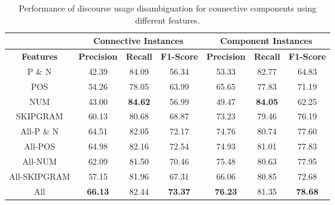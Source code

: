 \begin{table}[ht]
\centering
\begin{tabular}{|c|c|c|c|c|c|c|}
\hline
                    & \multicolumn{3}{|c|}{Connective Instances} & \multicolumn{3}{|c|}{Component Instances} \\ \hline
\bf Features        & \bf Precision & \bf Recall & \bf F1-Score  & \bf Precision & \bf Recall & \bf F1-Score \\ \hline
    P \& N          &     42.39     &     84.09  &     56.34     &     53.33     &     82.77  &     64.83    \\ \hline
    POS             &     54.26     &     78.05  &     63.99     &     65.65     &     77.83  &     71.19    \\ \hline
    NUM             &     43.00     & \bf 84.62  &     56.99     &     49.47     & \bf 84.05  &     62.25    \\ \hline
    SKIPGRAM        &     60.13     &     80.68  &     68.87     &     73.23     &     79.46  &     76.19    \\ \hline
    All-P \& N      &     64.51     &     82.05  &     72.17     &     74.76     &     80.74  &     77.60    \\ \hline
    All-POS         &     64.98     &     82.16  &     72.54     &     74.93     &     81.01  &     77.83    \\ \hline
    All-NUM         &     62.09     &     81.50  &     70.46     &     75.48     &     80.63  &     77.95    \\ \hline
    All-SKIPGRAM    &     57.15     &     81.96  &     67.31     &     66.06     &     80.85  &     72.68    \\ \hline
    All             & \bf 66.13     &     82.44  & \bf 73.37     & \bf 76.23     &     81.35  & \bf 78.68    \\ \hline

\end{tabular}
\caption{\label{t:recognition-connective-features} Performance of discourse usage
disambiguation for connective components using different features. }
\end{table}
